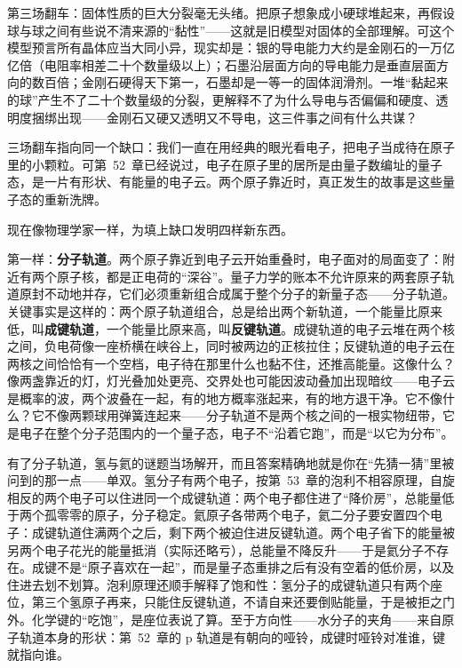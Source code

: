 第三场翻车：固体性质的巨大分裂毫无头绪。把原子想象成小硬球堆起来，再假设球与球之间有些说不清来源的“黏性”——这就是旧模型对固体的全部理解。可这个模型预言所有晶体应当大同小异，现实却是：银的导电能力大约是金刚石的一万亿亿倍（电阻率相差二十个数量级以上）；石墨沿层面方向的导电能力是垂直层面方向的数百倍；金刚石硬得天下第一，石墨却是一等一的固体润滑剂。一堆“黏起来的球”产生不了二十个数量级的分裂，更解释不了为什么导电与否偏偏和硬度、透明度捆绑出现——金刚石又硬又透明又不导电，这三件事之间有什么共谋？

三场翻车指向同一个缺口：我们一直在用经典的眼光看电子，把电子当成待在原子里的小颗粒。可第~52~章已经说过，电子在原子里的居所是由量子数编址的量子态，是一片有形状、有能量的电子云。两个原子靠近时，真正发生的故事是这些量子态的重新洗牌。


现在像物理学家一样，为填上缺口发明四样新东西。

第一样：\textbf{分子轨道}。两个原子靠近到电子云开始重叠时，电子面对的局面变了：附近有两个原子核，都是正电荷的“深谷”。量子力学的账本不允许原来的两套原子轨道原封不动地并存，它们必须重新组合成属于整个分子的新量子态——分子轨道。关键事实是这样的：两个原子轨道组合，总是给出两个新轨道，一个能量比原来低，叫\textbf{成键轨道}，一个能量比原来高，叫\textbf{反键轨道}。成键轨道的电子云堆在两个核之间，负电荷像一座桥横在峡谷上，同时被两边的正核拉住；反键轨道的电子云在两核之间恰恰有一个空档，电子待在那里什么也黏不住，还推高能量。这像什么？像两盏靠近的灯，灯光叠加处更亮、交界处也可能因波动叠加出现暗纹——电子云是概率的波，两个波叠在一起，有的地方概率涨起来，有的地方退干净。它不像什么？它不像两颗球用弹簧连起来——分子轨道不是两个核之间的一根实物纽带，它是电子在整个分子范围内的一个量子态，电子不“沿着它跑”，而是“以它为分布”。

有了分子轨道，氢与氦的谜题当场解开，而且答案精确地就是你在“先猜一猜”里被问到的那一点——单双。氢分子有两个电子，按第~53~章的泡利不相容原理，自旋相反的两个电子可以住进同一个成键轨道：两个电子都住进了“降价房”，总能量低于两个孤零零的原子，分子稳定。氦原子各带两个电子，氦二分子要安置四个电子：成键轨道住满两个之后，剩下两个被迫住进反键轨道。两个电子省下的能量被另两个电子花光的能量抵消（实际还略亏），总能量不降反升——于是氦分子不存在。成键不是“原子喜欢在一起”，而是量子态重排之后有没有空着的低价房，以及住进去划不划算。泡利原理还顺手解释了饱和性：氢分子的成键轨道只有两个座位，第三个氢原子再来，只能住反键轨道，不请自来还要倒贴能量，于是被拒之门外。化学键的“吃饱”，是座位表说了算。至于方向性——水分子的夹角——来自原子轨道本身的形状：第~52~章的 p 轨道是有朝向的哑铃，成键时哑铃对准谁，键就指向谁。

